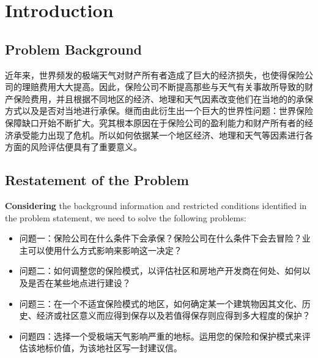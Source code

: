 \documentclass{mcmthesis}
\begin{document}
\section{Introduction}

\subsection{Problem Background}
近年来，世界频发的极端天气对财产所有者造成了巨大的经济损失，也使得保险公司的理赔费用大大提高。因此，保险公司不断提高那些与天气有关事故所导致的财产保险费用，并且根据不同地区的经济、地理和天气因素改变他们在当地的的承保方式以及是否对当地进行承保。继而由此衍生出一个巨大的世界性问题：世界保险保障缺口开始不断扩大。究其根本原因在于保险公司的盈利能力和财产所有者的经济承受能力出现了危机。所以如何依据某一个地区经济、地理和天气等因素进行各方面的风险评估便具有了重要意义。
\subsection{Restatement of the Problem}
\textbf{Considering} the background information and restricted conditions 
identified in the problem statement, we need to solve the following
problems:
\begin{itemize}
	\item 
	问题一：保险公司在什么条件下会承保？保险公司在什么条件下会去冒险？业主可以使用什么方式影响来影响这一决定？
	\item 
	问题二：如何调整您的保险模式，以评估社区和房地产开发商在何处、如何以及是否在某些地点进行建设？
	\item 
	问题三：在一个不适宜保险模式的地区，如何确定某一个建筑物因其文化、历史、经济或社区意义而应得到保存以及若值得保存则应得到多大程度的保护？
	\item 
	问题四：选择一个受极端天气影响严重的地标。运用您的保险和保护模式来评估该地标价值，为该地社区写一封建议信。
\end{itemize}
\end{document}
